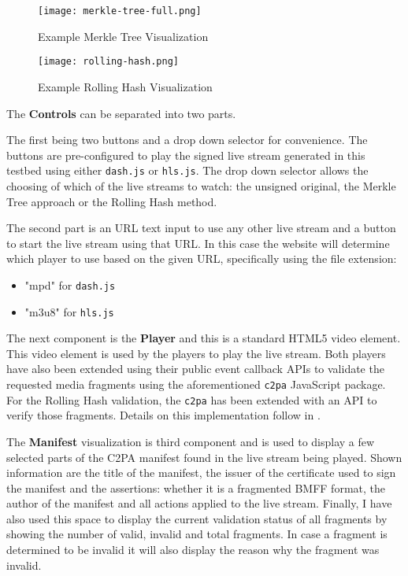 \begin{figure}
    \texttt{[image: merkle-tree-full.png]}
    \caption{Example Merkle Tree Visualization}
    \label{fig:merkle_tree}
\end{figure}
\begin{figure}
    \texttt{[image: rolling-hash.png]}
    \caption{Example Rolling Hash Visualization}
    \label{fig:rolling_hash}
\end{figure}

The \textbf{Controls} can be separated into two parts. 

The first being two buttons and a drop down selector for convenience. The buttons are pre-configured to play the signed live stream generated in this testbed using either \texttt{dash.js} or \texttt{hls.js}. The drop down selector allows the choosing of which of the live streams to watch: the unsigned original, the Merkle Tree approach or the Rolling Hash method.

The second part is an URL text input to use any other live stream and a button to start the live stream using that URL. In this case the website will determine which player to use based on the given URL, specifically using the file extension:

\begin{itemize}
    \item "mpd" for \texttt{dash.js}
    \item "m3u8" for \texttt{hls.js}
\end{itemize}

The next component is the \textbf{Player} and this is a standard HTML5 video element. This video element is used by the players to play the live stream. Both players have also been extended using their public event callback APIs to validate the requested media fragments using the aforementioned \texttt{c2pa} JavaScript package. For the Rolling Hash validation, the \texttt{c2pa} has been extended with an API to verify those fragments. Details on this implementation follow in .

The \textbf{Manifest} visualization is third component and is used to display a few selected parts of the C2PA manifest found in the live stream being played. Shown information are the title of the manifest, the issuer of the certificate used to sign the manifest and the assertions: whether it is a fragmented BMFF format, the author of the manifest and all actions applied to the live stream. Finally, I have also used this space to display the current validation status of all fragments by showing the number of valid, invalid and total fragments. In case a fragment is determined to be invalid it will also display the reason why the fragment was invalid.

